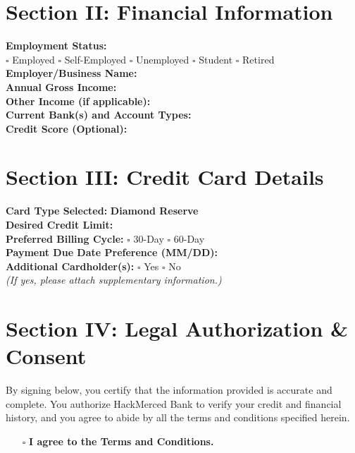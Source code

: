 \documentclass[12pt,a4paper]{article}
\begin{document}
\section*{Section II: Financial Information}
\noindent\textbf{Employment Status:}\\[1ex]
\hspace{0.5cm} $\square$ Employed \hspace{1cm} $\square$ Self-Employed \hspace{1cm} $\square$ Unemployed \hspace{1cm} $\square$ Student \hspace{1cm} $\square$ Retired\\[2ex]
\textbf{Employer/Business Name:} \\[2ex]
\textbf{Annual Gross Income:} \\[2ex]
\textbf{Other Income (if applicable):} \\[2ex]
\textbf{Current Bank(s) and Account Types:} \\[2ex]
\textbf{Credit Score (Optional):} \\[2ex]

\section*{Section III: Credit Card Details}
\noindent\textbf{Card Type Selected:} \textbf{Diamond Reserve}\\[1ex]
\textbf{Desired Credit Limit:} \\[2ex]
\textbf{Preferred Billing Cycle:} \hspace{0.5cm} $\square$ 30-Day \hspace{1cm} $\square$ 60-Day\\[2ex]
\textbf{Payment Due Date Preference (MM/DD):} \\[2ex]
\textbf{Additional Cardholder(s):} \hspace{0.5cm} $\square$ Yes \hspace{1cm} $\square$ No\\[1ex]
\textit{(If yes, please attach supplementary information.)}

\section*{Section IV: Legal Authorization \& Consent}
\noindent By signing below, you certify that the information provided is accurate and complete. You authorize HackMerced Bank to verify your credit and financial history, and you agree to abide by all the terms and conditions specified herein.
\begin{itemize}[leftmargin=1.5cm]
    \item[$\square$] \textbf{I agree to the Terms and Conditions.}
\end{itemize}
\end{document}
